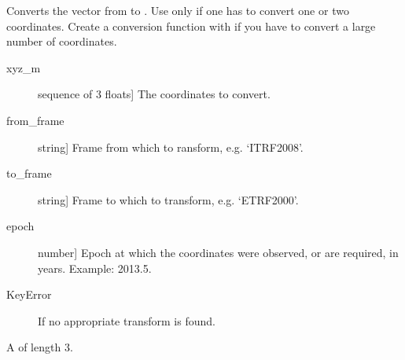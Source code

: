 \documentclass[a4paper,10pt,english]{sphinxmanual}
\begin{document}

\begin{fulllineitems}
\label{\detokenize{api-docs:etrsitrs.main.convert}}
Converts the  vector from  to . Use
only if one has to convert one or two coordinates. Create a
conversion function with  if you have to convert a
large number of coordinates.

\begin{description}
\item[{xyz\_m}] \leavevmode{[}sequence of 3 floats{]}
The coordinates to convert.

\item[{from\_frame}] \leavevmode{[}string{]}
Frame from which to ransform, e.g. ‘ITRF2008’.

\item[{to\_frame}] \leavevmode{[}string{]}
Frame to which to transform, e.g. ‘ETRF2000’.

\item[{epoch}] \leavevmode{[}number{]}
Epoch at which the coordinates were observed, or are
required, in years. Example: 2013.5.

\end{description}

\begin{description}
\item[{KeyError}] \leavevmode
If no appropriate transform is found.

\end{description}


A  of length 3.


\begin{sphinxVerbatim}[commandchars=\\\{\}]
  \PYG{p}{[}  \PYG{p}{]}
     
  
\end{sphinxVerbatim}


\end{fulllineitems}
\end{document}
